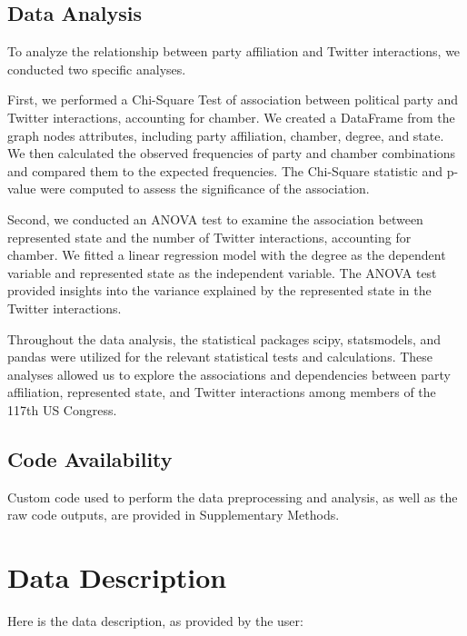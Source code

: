 \documentclass[11pt]{article}
\begin{document}
\subsection*{Data Analysis}
To analyze the relationship between party affiliation and Twitter interactions, we conducted two specific analyses. 

First, we performed a Chi-Square Test of association between political party and Twitter interactions, accounting for chamber. We created a DataFrame from the graph nodes attributes, including party affiliation, chamber, degree, and state. We then calculated the observed frequencies of party and chamber combinations and compared them to the expected frequencies. The Chi-Square statistic and p-value were computed to assess the significance of the association.

Second, we conducted an ANOVA test to examine the association between represented state and the number of Twitter interactions, accounting for chamber. We fitted a linear regression model with the degree as the dependent variable and represented state as the independent variable. The ANOVA test provided insights into the variance explained by the represented state in the Twitter interactions.

Throughout the data analysis, the statistical packages scipy, statsmodels, and pandas were utilized for the relevant statistical tests and calculations. These analyses allowed us to explore the associations and dependencies between party affiliation, represented state, and Twitter interactions among members of the 117th US Congress.\subsection*{Code Availability}

Custom code used to perform the data preprocessing and analysis, as well as the raw code outputs, are provided in Supplementary Methods.


\clearpage
\appendix

\section{Data Description} \label{sec:data_description} Here is the data description, as provided by the user:
\end{document}
